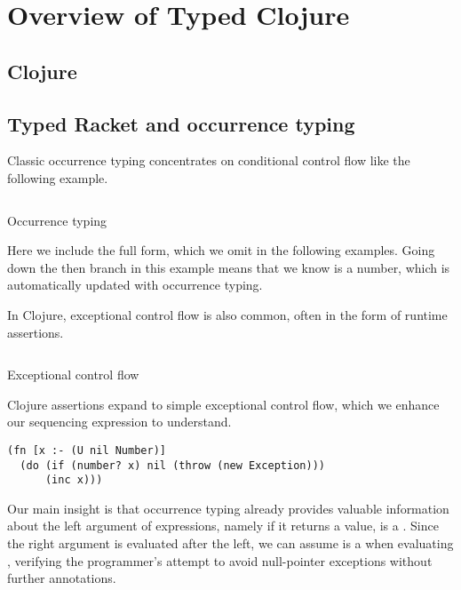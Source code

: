 \section{Overview of Typed Clojure}

\subsection{Clojure}

\subsection{Typed Racket and occurrence typing}

Classic occurrence typing concentrates on conditional
control flow like the following example.

\begin{listing}
\inputminted[firstline=1]{clojure}{code/demo/src/demo/eg1.clj}
\caption{Occurrence typing}
\end{listing}

Here we include the full  form, which we omit in the following
examples. Going down the then branch in this example means that we know
 is a number, which is automatically updated with occurrence typing.

In Clojure, exceptional control flow is also common, often in the form of
runtime assertions. 


\begin{listing}
\inputminted[firstline=5,lastline=7]{clojure}{code/demo/src/demo/do.clj}
\caption{Exceptional control flow}
\end{listing}

Clojure assertions expand to simple exceptional control flow,
which we enhance our sequencing \doliteral{} expression to understand.

\begin{verbatim}
(fn [x :- (U nil Number)]
  (do (if (number? x) nil (throw (new Exception)))
      (inc x)))
\end{verbatim}

Our main insight is that occurrence typing already provides
valuable information about the left argument of \doliteral{} expressions,
namely if it returns a value,  is a .
Since the right argument is evaluated after the left, we can assume
 is a  when evaluating , verifying
the programmer's attempt to avoid null-pointer exceptions without further annotations.

